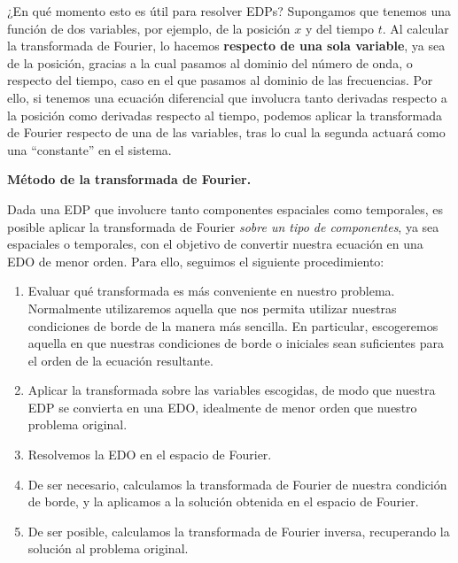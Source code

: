 ¿En qué momento esto es útil para resolver EDPs? Supongamos que tenemos una función de dos variables, por ejemplo, de la posición $x$ y del tiempo $t$. Al calcular la transformada de Fourier, lo hacemos \textbf{respecto de una sola variable}, ya sea de la posición, gracias a la cual pasamos al dominio del número de onda, o respecto del tiempo, caso en el que pasamos al dominio de las frecuencias. Por ello, si tenemos una ecuación diferencial que involucra tanto derivadas respecto a la posición como derivadas respecto al tiempo, podemos aplicar la transformada de Fourier respecto de una de las variables, tras lo cual la segunda actuará como una ``constante'' en el sistema.

\begin{propo}
    \textbf{Método de la transformada de Fourier.} \par
    Dada una EDP que involucre tanto componentes espaciales como temporales, es posible aplicar la transformada de Fourier \emph{sobre un tipo de componentes}, ya sea espaciales o temporales, con el objetivo de convertir nuestra ecuación en una EDO de menor orden. Para ello, seguimos el siguiente procedimiento:
    \begin{enumerate}
        \item Evaluar qué transformada es más conveniente en nuestro problema. Normalmente utilizaremos aquella que nos permita utilizar nuestras condiciones de borde de la manera más sencilla. En particular, escogeremos aquella en que nuestras condiciones de borde o iniciales sean suficientes para el orden de la ecuación resultante.
        \item Aplicar la transformada sobre las variables escogidas, de modo que nuestra EDP se convierta en una EDO, idealmente de menor orden que nuestro problema original.
        \item Resolvemos la EDO en el espacio de Fourier.
        \item De ser necesario, calculamos la transformada de Fourier de nuestra condición de borde, y la aplicamos a la solución obtenida en el espacio de Fourier.
        \item De ser posible, calculamos la transformada de Fourier inversa, recuperando la solución al problema original.
    \end{enumerate}

\end{propo}

